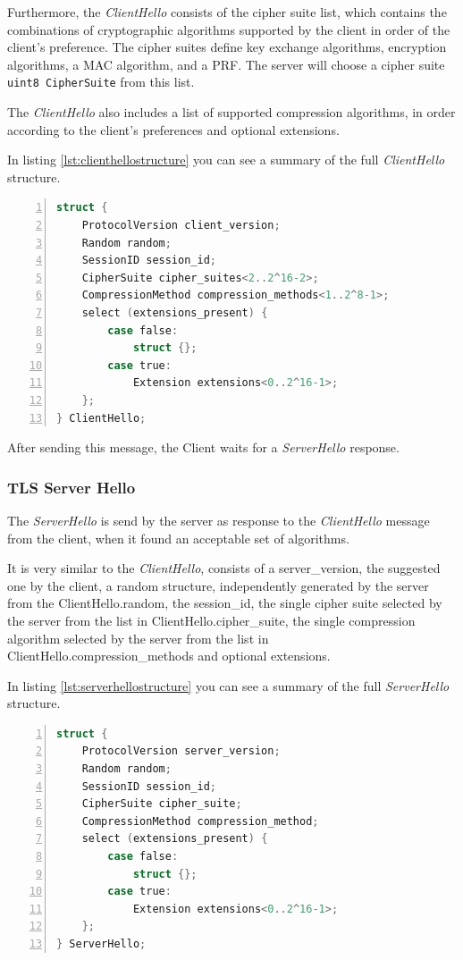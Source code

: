 \documentclass[sigconf, screen]{acmart}
\begin{document}
Furthermore, the \textit{ClientHello} consists of the cipher suite list, which contains the combinations of cryptographic algorithms supported by the client in order of the client's preference. The cipher suites define key exchange algorithms, encryption algorithms, a MAC algorithm, and a PRF. The server will choose a cipher suite \lstinline[language=C]{uint8 CipherSuite} from this list. 

The \textit{ClientHello} also includes a list of supported compression algorithms, in order according to the client's preferences and optional extensions.

In listing \ref{lst:clienthellostructure} you can see a summary of the full \textit{ClientHello} structure.
\begin{lstlisting}[language=C,  tabsize=4, numbers=left, xleftmargin=5.0ex, basicstyle=\footnotesize, breakatwhitespace=false, breaklines=true, frame=tb, caption=\textit{ClientHello} structure \cite{TLS_v1_2}., label=lst:clienthellostructure]
struct {
	ProtocolVersion client_version;
	Random random;
	SessionID session_id;
	CipherSuite cipher_suites<2..2^16-2>;
	CompressionMethod compression_methods<1..2^8-1>;
	select (extensions_present) {
		case false:
			struct {};
		case true:
			Extension extensions<0..2^16-1>;
	};
} ClientHello;
\end{lstlisting}

After sending this message, the Client waits for a \textit{ServerHello} response.
\subsubsection{TLS Server Hello}
\label{sss:tlsserverhello}
The \textit{ServerHello} is send by the server as response to the \textit{ClientHello} message from the client, when it found an acceptable set of algorithms.

It is very similar to the \textit{ClientHello}, consists of a server\_version, the suggested one by the client, a random structure, independently generated by the server from the ClientHello.random, the session\_id, the single cipher suite selected by the server from the list in ClientHello.cipher\_suite, the single compression algorithm selected by the server from the list in ClientHello.compression\_methods and optional extensions.

In listing \ref{lst:serverhellostructure} you can see a summary of the full \textit{ServerHello} structure.
\begin{lstlisting}[language=C,  tabsize=4, numbers=left, xleftmargin=5.0ex, basicstyle=\footnotesize, breakatwhitespace=false, breaklines=true, frame=tb, caption=\textit{ServerHello} structure \cite{TLS_v1_2}., label=lst:serverhellostructure]
struct {
	ProtocolVersion server_version;
	Random random;
    SessionID session_id;
    CipherSuite cipher_suite;
    CompressionMethod compression_method;
    select (extensions_present) {
    	case false:
    		struct {};
    	case true:
        	Extension extensions<0..2^16-1>;
	};
} ServerHello;
\end{lstlisting}
\end{document}
